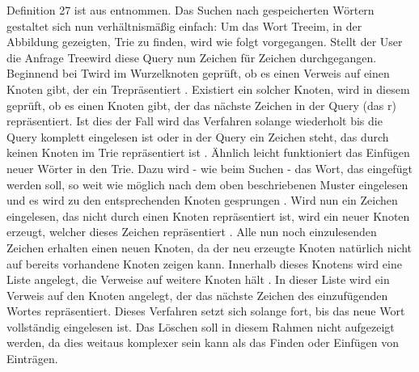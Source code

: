 Definition 27 ist aus \cite{Trie_wiki} entnommen.
\newline \newline
Das Suchen nach gespeicherten Wörtern gestaltet sich nun verhältnismäßig einfach: Um das Wort \glqq Tree\grqq im, in der Abbildung gezeigten, Trie zu finden, wird wie folgt vorgegangen.
\newline 
Stellt der User die Anfrage \glqq Tree\grqq wird diese Query nun Zeichen für Zeichen durchgegangen. Beginnend bei \glqq T\grqq wird im Wurzelknoten geprüft, ob es einen Verweis auf einen Knoten gibt, der ein \glqq T\grqq repräsentiert \cite{trie_Abb}. Existiert ein solcher Knoten, wird in diesem geprüft, ob es einen Knoten gibt, der das nächste Zeichen in der Query (das \glqq r\grqq) repräsentiert. Ist dies der Fall wird das Verfahren solange wiederholt bis die Query komplett eingelesen ist oder in der Query ein Zeichen steht, das durch keinen Knoten im Trie repräsentiert ist \cite{trie_Abb} \cite{Trie_Blog}.
\newline \newline
Ähnlich leicht funktioniert das Einfügen neuer Wörter in den Trie. Dazu wird - wie beim Suchen - das Wort, das eingefügt werden soll, so weit wie möglich nach dem oben beschriebenen Muster eingelesen und es wird zu den entsprechenden Knoten gesprungen \cite{trie_Abb} \cite{Trie_Blog}. Wird nun ein Zeichen eingelesen, das nicht durch einen Knoten repräsentiert ist, wird ein neuer Knoten erzeugt, welcher dieses Zeichen repräsentiert \cite{trie_Abb}. Alle nun noch einzulesenden Zeichen erhalten einen neuen Knoten, da der neu erzeugte Knoten natürlich nicht auf bereits vorhandene Knoten zeigen kann. Innerhalb dieses Knotens wird eine Liste angelegt, die Verweise auf weitere Knoten hält \cite{trie_Abb}. In dieser Liste wird ein Verweis auf den Knoten angelegt, der das nächste Zeichen des einzufügenden Wortes repräsentiert. Dieses Verfahren setzt sich solange fort, bis das neue Wort vollständig eingelesen ist.
\newline \newline
Das Löschen soll in diesem Rahmen nicht aufgezeigt werden, da dies weitaus komplexer sein kann als das Finden oder Einfügen von Einträgen.